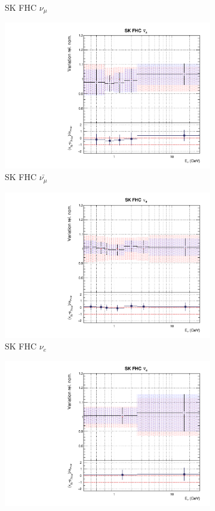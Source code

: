 \begin{figure}[t]
\begin{subfigure}{0.45\textwidth}
  \caption{SK FHC $\nu_{\mu}$}
\end{subfigure}
\begin{subfigure}{0.45\textwidth}
  \centering
  \includegraphics[width=0.75\linewidth]{figs/rhcmpdat248flux_9}
  \caption{SK FHC $\bar{\nu_{\mu}}$}
\end{subfigure}
\begin{subfigure}{0.45\textwidth}
  \centering
  \includegraphics[width=0.75\linewidth]{figs/rhcmpdat248flux_10}
  \caption{SK FHC $\nu_e$}
\end{subfigure}
\begin{subfigure}{0.45\textwidth}
  \centering
  \includegraphics[width=0.75\linewidth]{figs/rhcmpdat248flux_11}

\end{subfigure}
\end{figure}
